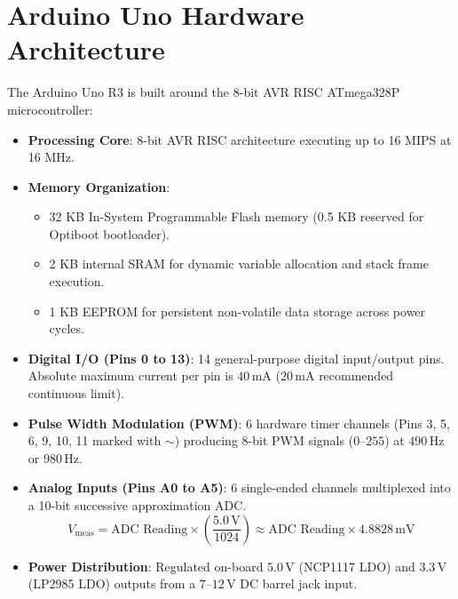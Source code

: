\section{Arduino Uno Hardware Architecture}
The Arduino Uno R3 is built around the 8-bit AVR RISC ATmega328P microcontroller:
\begin{itemize}
    \item \textbf{Processing Core}: 8-bit AVR RISC architecture executing up to 16 MIPS at 16 MHz.
    \item \textbf{Memory Organization}:
    \begin{itemize}
        \item 32 KB In-System Programmable Flash memory (0.5 KB reserved for Optiboot bootloader).
        \item 2 KB internal SRAM for dynamic variable allocation and stack frame execution.
        \item 1 KB EEPROM for persistent non-volatile data storage across power cycles.
    \end{itemize}
    \item \textbf{Digital I/O (Pins 0 to 13)}: 14 general-purpose digital input/output pins. Absolute maximum current per pin is $40\,\mathrm{mA}$ ($20\,\mathrm{mA}$ recommended continuous limit).
    \item \textbf{Pulse Width Modulation (PWM)}: 6 hardware timer channels (Pins 3, 5, 6, 9, 10, 11 marked with $\sim$) producing 8-bit PWM signals ($0\text{--}255$) at $490\,\mathrm{Hz}$ or $980\,\mathrm{Hz}$.
    \item \textbf{Analog Inputs (Pins A0 to A5)}: 6 single-ended channels multiplexed into a 10-bit successive approximation ADC.
    \[ V_{\mathrm{meas}} = \text{ADC Reading} \times \left( \frac{5.0\,\mathrm{V}}{1024} \right) \approx \text{ADC Reading} \times 4.8828\,\mathrm{mV} \]
    \item \textbf{Power Distribution}: Regulated on-board $5.0\,\mathrm{V}$ (NCP1117 LDO) and $3.3\,\mathrm{V}$ (LP2985 LDO) outputs from a $7\text{--}12\,\mathrm{V}$ DC barrel jack input.
\end{itemize}

